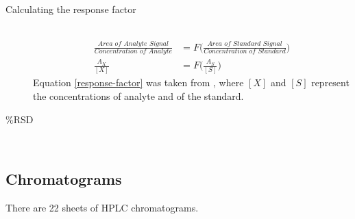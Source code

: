 \documentclass[a4paper, 12pt]{article}
\begin{document}
\begin{description}
	\item[Calculating the response factor] \hfill \\
		\begin{equation} \label{response-factor}
		\begin{split}
			\frac{\textit{Area of Analyte Signal}}{\textit{Concentration of Analyte}} & = F\Bigg(\frac{\textit{Area of Standard Signal}}{\textit{Concentration of Standard}}\Bigg) \\
			\frac{A_X}{[X]} & = F\Bigg(\frac{A_S}{[S]}\Bigg)
		\end{split}
		\end{equation}
			Equation \ref{response-factor} was taken from \cite{harris}, where $[X]$ and $[S]$ represent the concentrations of analyte and of the standard.

	\item[$\%$RSD] \hfill \\
\end{description}

\subsection{Chromatograms}
There are 22 sheets of HPLC chromatograms.

\end{document}
